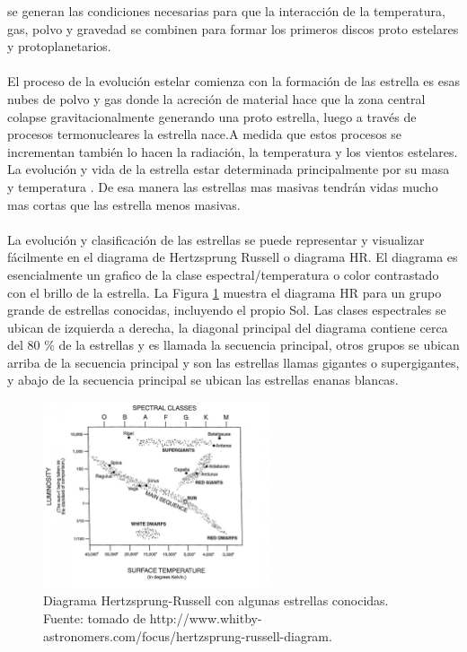 \documentclass[12pt]{article}
\begin{document}
se generan las condiciones necesarias para que la interacción de la temperatura, gas, polvo y gravedad 
se combinen para formar los primeros discos proto estelares y protoplanetarios.\\
\\
El proceso de la evolución estelar comienza  con la formación de las estrella es esas nubes de polvo y 
gas donde la acreción de material hace que la zona central colapse gravitacionalmente generando una 
proto estrella, luego a través de procesos termonucleares la estrella nace.A medida que estos procesos 
se incrementan también lo hacen la radiación, la temperatura y los vientos estelares. La evolución y 
vida de la estrella estar determinada principalmente por su masa y temperatura \parencite{Whittet2022DustIT}. 
De esa manera las estrellas mas masivas tendrán vidas mucho mas cortas que las estrella menos masivas. \\
\\
La evolución y clasificación de las estrellas se puede representar y visualizar fácilmente en el diagrama 
de Hertzsprung Russell o 
diagrama HR. El diagrama es esencialmente un grafico de la clase espectral/temperatura o color 
contrastado con el brillo de la estrella. La Figura \ref{fig:diagrama_HR} muestra el diagrama HR para un 
grupo grande de estrellas conocidas, incluyendo el propio Sol. 
Las clases espectrales se ubican de izquierda a derecha, la diagonal principal del diagrama contiene 
cerca del 80 \% de la estrellas y es llamada la secuencia principal, otros grupos se ubican arriba de 
la secuencia principal y son las estrellas llamas gigantes o supergigantes, y abajo de la secuencia 
principal se ubican las estrellas enanas blancas.
\begin{figure}[H]
    \includegraphics[width=0.6\textwidth]{images/HR_diagram.jpg}
    \centering
    \caption{Diagrama Hertzsprung-Russell con algunas estrellas conocidas. 
    Fuente: tomado de http://www.whitby-astronomers.com/focus/hertzsprung-russell-diagram.}
    \label{fig:diagrama_HR}
\end{figure}
\end{document}

